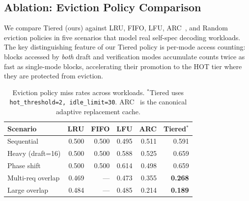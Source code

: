 \documentclass[review]{elsarticle}
\theoremstyle{definition}
\theoremstyle{remark}
\begin{document}
\subsection{Ablation: Eviction Policy Comparison}
\label{sec:eval-eviction}

We compare Tiered (ours) against LRU, FIFO, LFU, ARC~\cite{arc2003}, and Random eviction
policies in five scenarios that model real self-spec decoding
workloads. The key distinguishing feature of our Tiered policy is
per-mode access counting: blocks accessed by \emph{both} draft and
verification modes accumulate counts twice as fast as single-mode
blocks, accelerating their promotion to the HOT tier where they are
protected from eviction.

\begin{table}[t]
\centering
\caption{Eviction policy miss rates across workloads.
$^{*}$Tiered uses \texttt{hot\_threshold=2, idle\_limit=30}. ARC~\cite{arc2003} is the canonical adaptive replacement cache.}
\label{tab:eviction}
\begin{tabular}{lrrrrr}
\toprule
Scenario & LRU & FIFO & LFU & ARC & \textbf{Tiered}$^{*}$ \\
\midrule
Sequential & 0.500 & 0.500 & 0.495 & 0.511 & 0.591 \\
Heavy (draft=16) & 0.500 & 0.500 & 0.588 & 0.525 & 0.659 \\
Phase shift & 0.500 & 0.500 & 0.614 & 0.498 & 0.659 \\
\midrule
Multi-req overlap & 0.469 & --- & 0.473 & 0.355 & \textbf{0.268} \\
Large overlap & 0.484 & --- & 0.485 & 0.214 & \textbf{0.189} \\
\bottomrule
\end{tabular}
\end{table}
\end{document}
